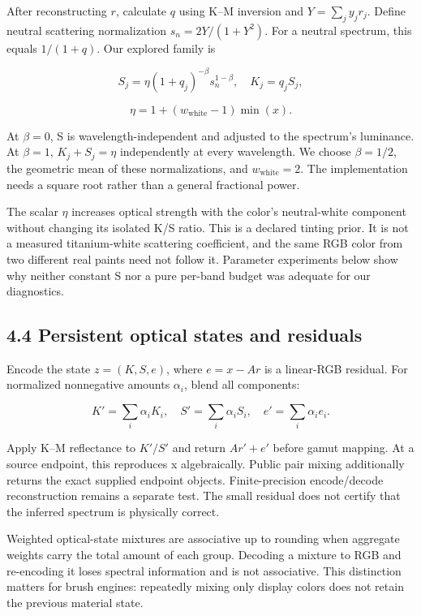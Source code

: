 \documentclass[
  10pt,
  twocolumn]{article}
\begin{document}
After reconstructing \(r\), calculate \(q\) using K--M inversion and
\(Y=\sum_jy_jr_j\). Define neutral scattering normalization
\(s_n=2Y/(1+Y^2)\). For a neutral spectrum, this equals \(1/(1+q)\). Our
explored family is

\[S_j=\eta(1+q_j)^{-\beta}s_n^{1-\beta},\quad K_j=q_jS_j,\]

\[\eta=1+(w_{\mathrm{white}}-1)\min(x).\]

At \(\beta=0\), S is wavelength-independent and adjusted to the
spectrum's luminance. At \(\beta=1\), \(K_j+S_j=\eta\) independently at
every wavelength. We choose \(\beta=1/2\), the geometric mean of these
normalizations, and \(w_{\mathrm{white}}=2\). The implementation needs a
square root rather than a general fractional power.

The scalar \(\eta\) increases optical strength with the color's
neutral-white component without changing its isolated K/S ratio. This is
a declared tinting prior. It is not a measured titanium-white scattering
coefficient, and the same RGB color from two different real paints need
not follow it. Parameter experiments below show why neither constant S
nor a pure per-band budget was adequate for our diagnostics.

\hypertarget{persistent-optical-states-and-residuals}{%
\subsection{4.4 Persistent optical states and
residuals}\label{persistent-optical-states-and-residuals}}

Encode the state \(z=(K,S,e)\), where \(e=x-Ar\) is a linear-RGB
residual. For normalized nonnegative amounts \(\alpha_i\), blend all
components:

\[K'=\sum_i\alpha_iK_i,\quad S'=\sum_i\alpha_iS_i,\quad e'=\sum_i\alpha_i e_i.\]

Apply K--M reflectance to \(K'/S'\) and return \(Ar'+e'\) before gamut
mapping. At a source endpoint, this reproduces x algebraically. Public
pair mixing additionally returns the exact supplied endpoint objects.
Finite-precision encode/decode reconstruction remains a separate test.
The small residual does not certify that the inferred spectrum is
physically correct.

Weighted optical-state mixtures are associative up to rounding when
aggregate weights carry the total amount of each group. Decoding a
mixture to RGB and re-encoding it loses spectral information and is not
associative. This distinction matters for brush engines: repeatedly
mixing only display colors does not retain the previous material state.
\end{document}
